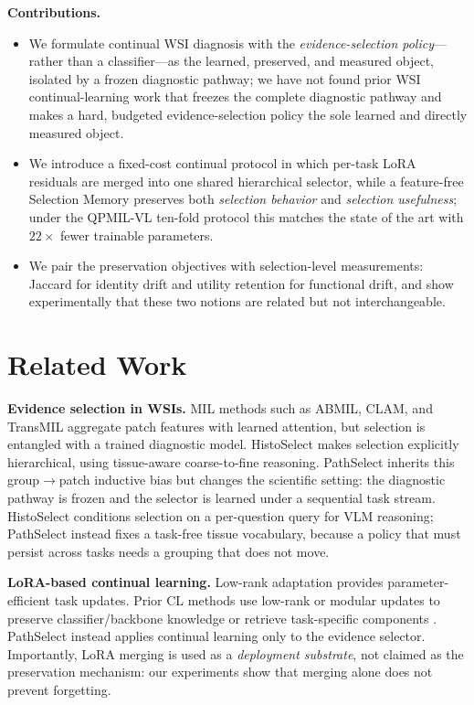 \documentclass{article}
\begin{document}
\textbf{Contributions.}
\begin{itemize}
    \item We formulate continual WSI diagnosis with the \emph{evidence-selection policy}---rather than a classifier---as the learned, preserved, and measured object, isolated by a frozen diagnostic pathway; we have not found prior WSI continual-learning work that freezes the complete diagnostic pathway and makes a hard, budgeted evidence-selection policy the sole learned and directly measured object.
    \item We introduce a fixed-cost continual protocol in which per-task LoRA residuals are merged into one shared hierarchical selector, while a feature-free Selection Memory preserves both \emph{selection behavior} and \emph{selection usefulness}; under the QPMIL-VL ten-fold protocol this matches the state of the art with $22\times$ fewer trainable parameters.
    \item We pair the preservation objectives with selection-level measurements: Jaccard for identity drift and utility retention for functional drift, and show experimentally that these two notions are related but not interchangeable.
\end{itemize}

\section{Related Work}
\label{sec:related}

\textbf{Evidence selection in WSIs.}
MIL methods such as ABMIL, CLAM, and TransMIL \cite{ilse2018abmil,lu2021clam,shao2021transmil} aggregate patch features with learned attention, but selection is entangled with a trained diagnostic model.
HistoSelect \cite{huang2026histoselect} makes selection explicitly hierarchical, using tissue-aware coarse-to-fine reasoning.
PathSelect inherits this group$\rightarrow$patch inductive bias but changes the scientific setting: the diagnostic pathway is frozen and the selector is learned under a sequential task stream. HistoSelect conditions selection on a per-question query for VLM reasoning; PathSelect instead fixes a task-free tissue vocabulary, because a policy that must persist across tasks needs a grouping that does not move.

\textbf{LoRA-based continual learning.}
Low-rank adaptation \cite{hu2022lora} provides parameter-efficient task updates.
Prior CL methods use low-rank or modular updates to preserve classifier/backbone knowledge or retrieve task-specific components \cite{liang2024inflora,wu2025sdlora,he2025cllora,chen2026flexem}.
PathSelect instead applies continual learning only to the evidence selector.
Importantly, LoRA merging is used as a \emph{deployment substrate}, not claimed as the preservation mechanism: our experiments show that merging alone does not prevent forgetting.
\end{document}
